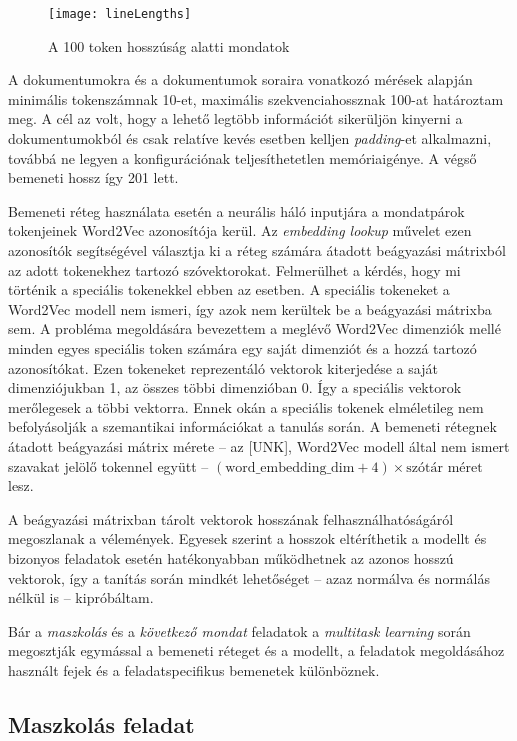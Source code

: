 \begin{figure}[H]
	\centering
	\texttt{[image: lineLengths]}
	\caption{A 100 token hosszúság alatti mondatok}
\end{figure}

A dokumentumokra és a dokumentumok soraira vonatkozó mérések alapján minimális tokenszámnak 10-et, maximális szekvenciahossznak 100-at határoztam meg. A cél az volt, hogy a lehető legtöbb információt sikerüljön kinyerni a dokumentumokból és csak relatíve kevés esetben kelljen \textit{padding}-et alkalmazni, továbbá ne legyen a konfigurációnak teljesíthetetlen memóriaigénye. A végső bemeneti hossz így 201 lett.

Bemeneti réteg használata esetén a neurális háló inputjára a mondatpárok tokenjeinek Word2Vec azonosítója kerül. Az \textit{embedding lookup} művelet ezen azonosítók segítségével választja ki a réteg számára átadott beágyazási mátrixból az adott tokenekhez tartozó szóvektorokat. Felmerülhet a kérdés, hogy mi történik a speciális tokenekkel ebben az esetben. A speciális tokeneket a Word2Vec modell nem ismeri, így azok nem kerültek be a beágyazási mátrixba sem. A probléma megoldására bevezettem a meglévő Word2Vec dimenziók mellé minden egyes speciális token számára egy saját dimenziót és a hozzá tartozó azonosítókat. Ezen tokeneket reprezentáló vektorok kiterjedése a saját dimenziójukban 1, az összes többi dimenzióban 0. Így a speciális vektorok merőlegesek a többi vektorra. Ennek okán a speciális tokenek elméletileg nem befolyásolják a szemantikai információkat a tanulás során. A bemeneti rétegnek átadott beágyazási mátrix mérete – az [UNK], Word2Vec modell által nem ismert szavakat jelölő tokennel együtt – $(\text{word\_embedding\_dim} + 4) \times \text{szótár méret} $ lesz.

A beágyazási mátrixban tárolt vektorok hosszának felhasználhatóságáról megoszlanak a vélemények. Egyesek szerint a hosszok eltéríthetik a modellt és bizonyos feladatok esetén hatékonyabban működhetnek az azonos hosszú vektorok, így a tanítás során mindkét lehetőséget – azaz normálva és normálás nélkül is – kipróbáltam.

Bár a \textit{maszkolás} és a \textit{következő mondat} feladatok a \textit{multitask learning} során megosztják egymással a bemeneti réteget és a modellt, a feladatok megoldásához használt fejek és a feladatspecifikus bemenetek különböznek.

\subsection{Maszkolás feladat}

